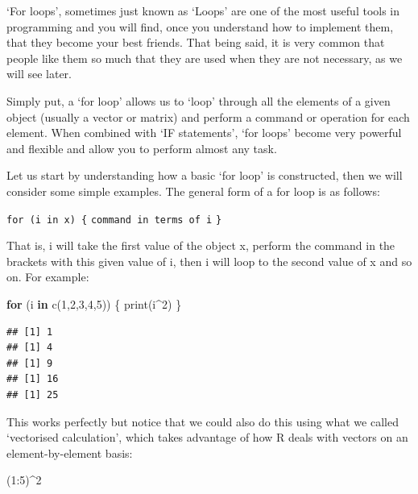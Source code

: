 \documentclass[
]{book}
\newenvironment{Shaded}{\begin{snugshade}}{\end{snugshade}}
\newcommand{\ControlFlowTok}[1]{\textcolor[rgb]{0.13,0.29,0.53}{\textbf{#1}}}
\newcommand{\DecValTok}[1]{\textcolor[rgb]{0.00,0.00,0.81}{#1}}
\newcommand{\FunctionTok}[1]{\textcolor[rgb]{0.00,0.00,0.00}{#1}}
\newcommand{\NormalTok}[1]{#1}
\newcommand{\SpecialCharTok}[1]{\textcolor[rgb]{0.00,0.00,0.00}{#1}}
\theoremstyle{definition}
\theoremstyle{definition}
\theoremstyle{definition}
\theoremstyle{definition}
\theoremstyle{remark}
\begin{document}
`For loops', sometimes just known as `Loops' are one of the most useful tools in programming and you will find, once you understand how to implement them, that they become your best friends. That being said, it is very common that people like them so much that they are used when they are not necessary, as we will see later.

Simply put, a `for loop' allows us to `loop' through all the elements of a given object (usually a vector or matrix) and perform a command or operation for each element. When combined with `IF statements', `for loops' become very powerful and flexible and allow you to perform almost any task.

Let us start by understanding how a basic `for loop' is constructed, then we will consider some simple examples. The general form of a for loop is as follows:

\texttt{for\ (i\ in\ x)\ \{}
\texttt{command\ in\ terms\ of\ i}
\texttt{\}}

That is, i will take the first value of the object x, perform the command in the brackets with this given value of i, then i will loop to the second value of x and so on. For example:

\begin{Shaded}
\begin{Highlighting}[]
\ControlFlowTok{for}\NormalTok{ (i }\ControlFlowTok{in} \FunctionTok{c}\NormalTok{(}\DecValTok{1}\NormalTok{,}\DecValTok{2}\NormalTok{,}\DecValTok{3}\NormalTok{,}\DecValTok{4}\NormalTok{,}\DecValTok{5}\NormalTok{)) \{}
  \FunctionTok{print}\NormalTok{(i}\SpecialCharTok{\^{}}\DecValTok{2}\NormalTok{)}
\NormalTok{\}}
\end{Highlighting}
\end{Shaded}

\begin{verbatim}
## [1] 1
## [1] 4
## [1] 9
## [1] 16
## [1] 25
\end{verbatim}

This works perfectly but notice that we could also do this using what we called `vectorised calculation', which takes advantage of how R deals with vectors on an element-by-element basis:

\begin{Shaded}
\begin{Highlighting}[]
\NormalTok{(}\DecValTok{1}\SpecialCharTok{:}\DecValTok{5}\NormalTok{)}\SpecialCharTok{\^{}}\DecValTok{2}
\end{Highlighting}
\end{Shaded}
\end{document}
